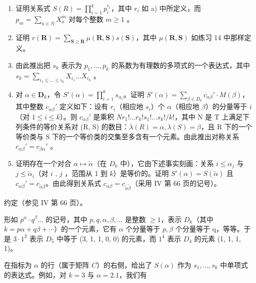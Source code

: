 \begin{enumerate}
\def\labelenumi{\alph{enumi})}
\setcounter{enumi}{1}
\item
  证明关系式 \(S(R) = \prod_{i=1}^{k} p_i^{r_i}\)，其中 \(r_i\) 如 a) 中所定义，而 \(p_m = \sum_{n \in N} X_n^m\) 对每个整数 \(m \geqslant 1\) 。
\item
  证明 \(r(\mathbf{R}) = \sum_{\mathbf{S} \geqslant \mathbf{R}} \mu(\mathbf{R}, \mathbf{S}) s(\mathbf{S})\)，其中 \(\mu(\mathbf{R}, \mathbf{S})\) 如练习 14 中那样定义。
\item
  由此推出把 \(s_k\) 表示为 \(p_1, \ldots, p_k\) 的系数为有理数的多项式的一个表达式，其中 \(s_k = \sum_{i_1 \leq \ldots \leq i_k} X_{i_1} \ldots X_{i_k}\) 。
\item
  对 \(\alpha \in \mathbf{D}_k\)，令 \(S'(\alpha) = \prod_{i=1}^{k} s_{\alpha_i}\)。证明 \(S'(\alpha) = \sum_{\beta \in D_k} c_{\alpha\beta}' \cdot M(\beta)\)，其中整数 \(c_{\alpha\beta}'\) 定义如下：设有 \(r_i\)（相应地 \(s_i\)）个 \(\alpha\)（相应地 \(\beta\)）的分量等于 \(i\)（对 \(1 \leqslant i \leqslant k\)）。则 \(c_{\alpha\beta}'\) 是乘积 \(Nr_1!... r_k!s_1!... s_k!/k!\)，其中 N 是 T 上满足下列条件的等价关系对 (R, S) 的数目：\(\lambda(R) = \alpha, \lambda(S) = \beta\)，且 R 下的一个等价类与 S 下的一个等价类的交集至多含有一个元素。由此推出对称关系 \(c_{\alpha\beta}' = c_{\beta\alpha}'\) 。
\item
  证明存在一个对合 \(\alpha \mapsto \tilde{\alpha}\)（在 \(D_k\) 中），它由下述事实刻画：关系 \(i \leqslant \alpha_j\) 与 \(j \leqslant \tilde{\alpha}_i\)（对 \(i\) , \(j\) ，范围从 1 到 \(k\)）是等价的。证明 \(S'(\alpha) = S(\tilde{\alpha})\) 且 \(c_{\alpha\beta}' = c_{\tilde{\alpha}\beta}\)。由此得到关系式 \(c_{\alpha\beta} = c_{\tilde{\alpha}\tilde{\beta}}\)（采用 IV 第 66 页的记号）。
\end{enumerate}


约定（参见 IV 第 66 页）。

形如 \(p^{\alpha} \cdot q^{\beta} \ldots\) 的记号，其中 \(p, q, \alpha, \beta, \ldots\) 是整数 \(\geqslant 1\)，表示 \(D_{k}\)（其中 \(k = p\alpha + q\beta + \cdots\)）的一个元素，它有 \(\alpha\) 个分量等于 \(p, \beta\) 个分量等于 q，等等。于是 \(3 \cdot 1^{2}\) 表示 \(D_{5}\) 中等于 (3, 1, 1, 0, 0) 的元素，而 \(1^{4}\) 表示 \(D_{4}\) 的元素 (1, 1, 1, 1)。

在指标为 \(\alpha\) 的行（属于矩阵 \(C\)）的右侧，给出了 \(S(\alpha)\) 作为 \(s_1, \ldots, s_k\) 中单项式的表达式。例如，对 \(k = 3\) 与 \(\alpha = 2.1\)，我们有

